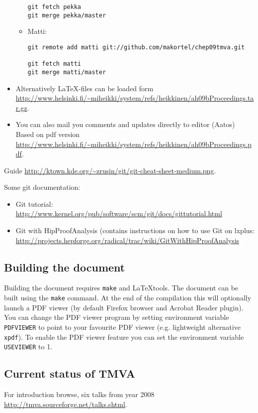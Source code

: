 \begin{appendix}
\begin{itemize}
\begin{itemize}
\begin{verbatim}
git fetch pekka
git merge pekka/master
\end{verbatim}
\item Matti:
\begin{verbatim}
git remote add matti git://github.com/makortel/chep09tmva.git

git fetch matti
git merge matti/master
\end{verbatim}
\end{itemize}

\item Alternatively LaTeX-files can be loaded form
\url{http://www.helsinki.fi/~miheikki/system/refs/heikkinen/ah09bProceedings.tar.gz}.
\item You can also mail you comments and updates directly to editor (Aatos)
Based on pdf version
\url{http://www.helsinki.fi/~miheikki/system/refs/heikkinen/ah09bProceedings.pdf}.
\end{itemize}

Guide \url{http://ktown.kde.org/~zrusin/git/git-cheat-sheet-medium.png}.

Some git documentation:
\begin{itemize}
\item Git tutorial: \url{http://www.kernel.org/pub/software/scm/git/docs/gittutorial.html}
\item Git with HipProofAnalysis (contains instructions on how to use
  Git on lxplus:
  \url{http://projects.hepforge.org/radical/trac/wiki/GitWithHipProofAnalysis}
\end{itemize}

\subsection{Building the document}

Building the document requires {\tt make} and \LaTeX tools. The
document can be built using the {\tt make} command. At the end of the
compilation this will optionally launch a PDF viewer (by default Firefox browser
and Acrobat Reader plugin). You can change the PDF viewer program by
setting environment variable {\tt PDFVIEWER} to point to your
favourite PDF viewer (e.g. lightweight alternative {\tt xpdf}). To
enable the PDF viewer feature you can set the environment
variable {\tt USEVIEWER} to 1.

\subsection{Current status of TMVA}
For introduction browse, six talks from year 2008 \url{http://tmva.sourceforge.net/talks.shtml}.


\end{appendix}
